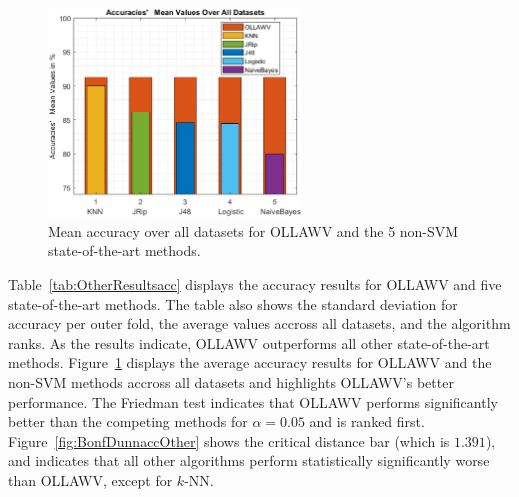 \documentclass[reqno]{vcuthesis}
\numberwithin{equation}{chapter}
\begin{document}
\begin{table}[t!]
\begin{minipage}{0.9\textwidth}
{}
\captionsetup{width=\linewidth}
\label{fig:BonfDunnaccOther}
\end{minipage}
\end{table}

\begin{figure}
\centering
\includegraphics[width=0.6\textwidth]{figures/others.eps}
\caption{Mean accuracy over all datasets for OLLAWV and the 5 non-SVM state-of-the-art methods.}
\label{fig:accother}
\end{figure}
Table~\ref{tab:OtherResultsacc} displays the accuracy results for OLLAWV and five state-of-the-art methods. The table also shows the standard deviation for accuracy per outer fold, the average values accross all datasets, and the algorithm ranks. As the results indicate, OLLAWV outperforms all other state-of-the-art methods. Figure~\ref{fig:accother} displays the average accuracy results for OLLAWV and the non-SVM methods accross all datasets and highlights OLLAWV's better performance. The Friedman test indicates that OLLAWV performs significantly better than the competing methods for $\alpha = 0.05$ and is ranked first. Figure~\ref{fig:BonfDunnaccOther} shows the critical distance bar (which is $1.391$), and indicates that all other algorithms perform statistically significantly worse than OLLAWV, except for $k$-NN. 
\end{document}
